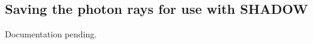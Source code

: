 \subsection*{Saving the photon rays for use with SHADOW}
\label{s:shadow-output}
Documentation pending.
